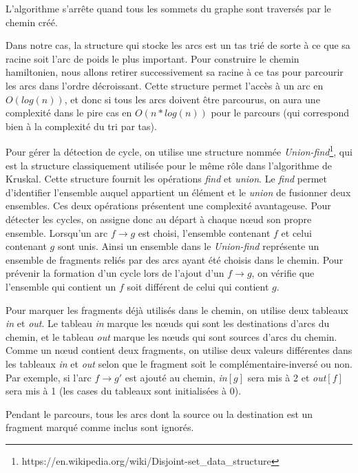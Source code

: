 \documentclass{article}
\begin{document}
L'algorithme s'arrête quand tous les sommets du graphe sont traversés par le chemin créé.

Dans notre cas, la structure qui stocke les arcs est un tas trié de sorte à ce que sa racine soit l'arc de poids le plus important. Pour construire le chemin hamiltonien, nous allons retirer successivement sa racine à ce tas pour parcourir les arcs dans l'ordre décroissant. Cette structure permet l'accès à un arc en $O(log(n))$, et donc si tous les arcs doivent être parcourus,  on aura une complexité dans le pire cas en $O(n*log(n))$ pour le parcours (qui correspond bien à la complexité du tri par tas).

Pour gérer la détection de cycle, on utilise une structure nommée \textit{Union-find}\footnote{https://en.wikipedia.org/wiki/Disjoint-set\_data\_structure}, qui est la structure classiquement utilisée pour le même rôle dans l'algorithme de Kruskal. Cette structure fournit les opérations \textit{find} et \textit{union}. Le \textit{find} permet d'identifier l'ensemble auquel appartient un élément et le \textit{union} de fusionner deux ensembles. Ces deux opérations présentent une complexité avantageuse. Pour détecter les cycles, on assigne donc au départ à chaque nœud son propre ensemble. Lorsqu'un arc $f \to g$ est choisi, l'ensemble contenant $f$ et celui contenant $g$ sont unis. Ainsi un ensemble dans le \textit{Union-find} représente un ensemble de fragments reliés par des arcs ayant été choisis dans le chemin. Pour prévenir la formation d'un cycle lors de l'ajout d'un $f \to g$, on vérifie que l'ensemble qui contient un $f$ soit différent de celui qui contient $g$.

Pour marquer les fragments déjà utilisés dans le chemin, on utilise deux tableaux \textit{in} et \textit{out}. Le tableau \textit{in} marque les nœuds qui sont les destinations d'arcs du chemin, et le tableau \textit{out} marque les nœuds qui sont sources d'arcs du chemin. Comme un nœud contient deux fragments, on utilise deux valeurs différentes dans les tableaux \textit{in} et \textit{out} selon que le fragment soit le complémentaire-inversé ou non. Par exemple, si l'arc $f \to g'$ est ajouté au chemin, \textit{in}$[g]$ sera mis à 2 et \textit{out}$[f]$ sera mis à 1 (les cases du tableaux sont initialisées à 0).

Pendant le parcours, tous les arcs dont la source ou la destination est un fragment marqué comme inclus sont ignorés.
\end{document}
